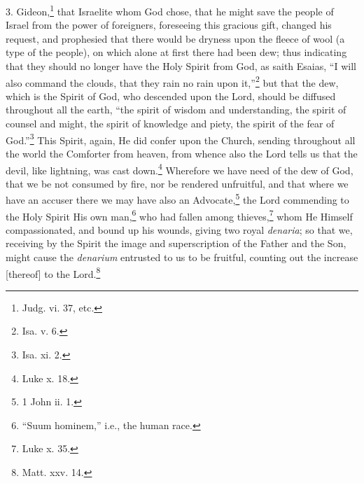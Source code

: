 3. Gideon,\footnote{Judg. vi. 37, etc.} that Israelite whom God chose, that he might save the people of Israel from the power of foreigners, foreseeing this gracious gift, changed his request, and prophesied that there would be dryness upon the fleece of wool (a type of the people), on which alone at first there had been dew; thus indicating that they should no longer have the Holy Spirit from God, as saith Esaias, “I will also command the clouds, that they rain no rain upon it,”\footnote{Isa. v. 6.} but that the dew, which is the Spirit of God, who descended upon the Lord, should be diffused throughout all the earth, “the spirit of wisdom and understanding, the spirit of counsel and might, the spirit of knowledge and piety, the spirit of the fear of God.”\footnote{Isa. xi. 2.} This Spirit, again, He did confer upon the Church, sending throughout all the world the Comforter from heaven, from whence also the Lord tells us that the devil, like lightning, was cast down.\footnote{Luke x. 18.} Wherefore we have need of the dew of God, that we be not consumed by fire, nor be rendered unfruitful, and that where we have an accuser there we may have also an Advocate,\footnote{1 John ii. 1.} the Lord commending to the Holy Spirit His own man,\footnote{“Suum hominem,” i.e., the human race.} who had fallen among thieves,\footnote{Luke x. 35.} whom He Himself compassionated, and bound up his wounds, giving two royal \emph{denaria}; so that we, receiving by the Spirit the image and superscription of the Father and the Son, might cause the \emph{denarium} entrusted to us to be fruitful, counting out the increase [thereof] to the Lord.\footnote{Matt. xxv. 14.}

